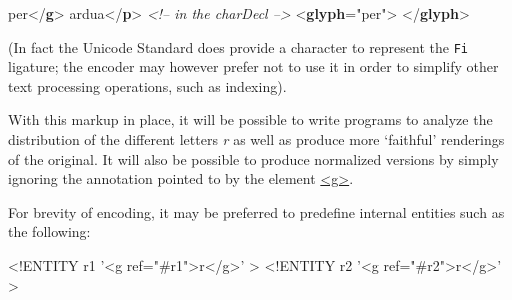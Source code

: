 \begin{shaded}
\hspace*{1em}per{</\textbf{g}>}\mbox{}\newline 
{} ardua{</\textbf{p}>}\mbox{}\newline 
\textit{<!-- in the charDecl -->}\mbox{}\newline 
{<\textbf{glyph}\hspace*{1em}{xml:id}="{per}">}\mbox{}\newline 
{}\mbox{}\newline 
{}\mbox{}\newline 
\hspace*{1em}\mbox{}\newline 
{}\mbox{}\newline 
{</\textbf{glyph}>}\end{shaded}\egroup\par \noindent  (In fact the Unicode Standard does provide a character to represent the \texttt{Fi} ligature; the encoder may however prefer not to use it in order to simplify other text processing operations, such as indexing).\par
With this markup in place, it will be possible to write programs to analyze the distribution of the different letters \textit{r} as well as produce more ‘faithful’ renderings of the original. It will also be possible to produce normalized versions by simply ignoring the annotation pointed to by the element \hyperref[TEI.g]{<g>}. \par
For brevity of encoding, it may be preferred to predefine internal entities such as the following: \par\hfill\bgroup\exampleFont\vskip 10pt\begin{shaded}
\obeyspaces <!ENTITY r1 '<g ref="\#r1">r</g>' >\newline
<!ENTITY r2 '<g ref="\#r2">r</g>' >\end{shaded}
